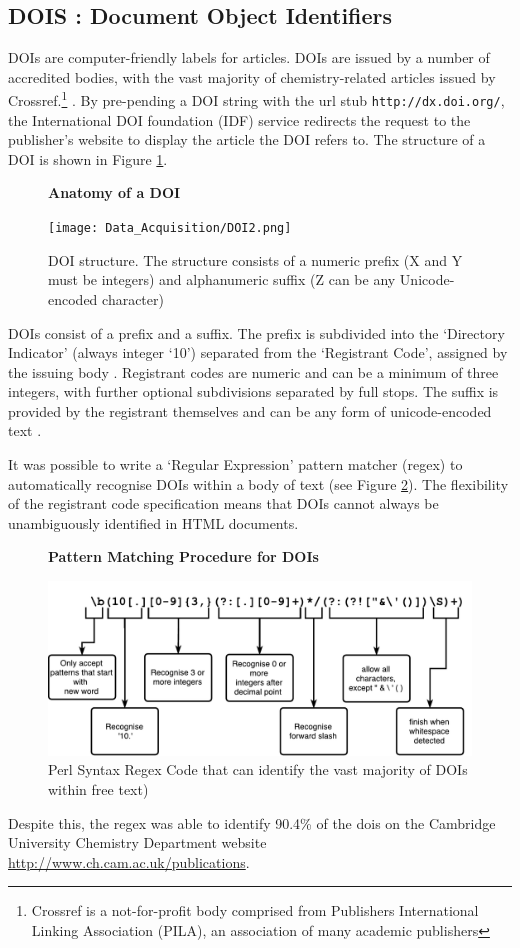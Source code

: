 \subsection{DOIS : Document Object Identifiers}
\label{sec:DOI}
DOIs are computer-friendly labels for articles. DOIs are issued by a number of accredited bodies, with the vast majority of chemistry-related articles issued by Crossref.\footnote{Crossref is a not-for-profit body comprised from Publishers International Linking Association (PILA), an association of many academic publishers} \cite{crossref-formation}. By pre-pending a DOI string with the url stub \texttt{http://dx.doi.org/}, the International DOI foundation (IDF) service redirects the request to the publisher's website to display the article the DOI refers to. The structure of a DOI is shown in Figure \ref{fig:DOI}.
\begin{figure}[H]
    \centering
    \textbf{Anatomy of a DOI}\par\medskip
    \texttt{[image: Data\_Acquisition/DOI2.png]}
    \caption[Anatomy of a DOI]{DOI structure. The structure consists of a numeric prefix (X and Y must be integers) and alphanumeric suffix (Z can be any Unicode-encoded character) \label{fig:DOI}}
\end{figure}
DOIs consist of a prefix and a suffix. The prefix is subdivided into the ‘Directory Indicator’ (always integer ‘10’) separated from the ‘Registrant Code’, assigned by the issuing body \cite{doi_handbook1}. Registrant codes are numeric and can be a minimum of three integers, with further optional subdivisions separated by full stops. The suffix is provided by the registrant themselves and can be any form of unicode-encoded text \cite{doi_handbook1}.


It was possible to write a `Regular Expression' pattern matcher (regex) to automatically recognise DOIs within a body of text (see Figure \ref{fig:REGEX}). The flexibility of the registrant code specification means that DOIs cannot always be unambiguously identified in HTML documents. 
\begin{figure}[H]
    \centering
    \textbf{Pattern Matching Procedure for DOIs}\par\medskip
    \includegraphics[width=\textwidth]{Data_Acquisition/Regex.pdf}
    \caption[Pattern Matching Procdure for DOIs]{Perl Syntax Regex Code that can identify the vast majority of DOIs within free text) \label{fig:REGEX}}
\end{figure}
Despite this, the regex was able to identify 90.4\% of the dois on the Cambridge University Chemistry Department website \url{http://www.ch.cam.ac.uk/publications}. 
